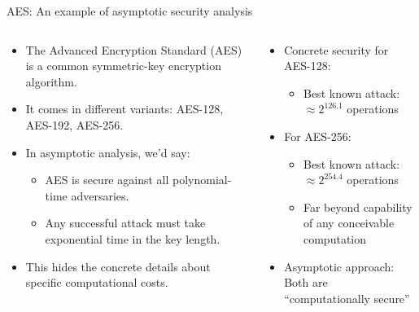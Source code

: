 \documentclass[aspectratio=169, lualatex, handout]{beamer}
\begin{document}
\begin{frame}{AES: An example of asymptotic security analysis}
	\begin{columns}[c]
		\begin{column}{0.5\textwidth}
			\begin{itemize}[<+->]
				\item The Advanced Encryption Standard (AES) is a common symmetric-key encryption algorithm.
				\item It comes in different variants: AES-128, AES-192, AES-256.
				\item In asymptotic analysis, we'd say:
				      \begin{itemize}
					      \item AES is secure against all polynomial-time adversaries.
					      \item Any successful attack must take exponential time in the key length.
				      \end{itemize}
				\item This hides the concrete details about specific computational costs.
			\end{itemize}
		\end{column}
		\begin{column}{0.5\textwidth}
			\begin{itemize}[<+->]
				\item Concrete security for AES-128:
				      \begin{itemize}
					      \item Best known attack: $\approx 2^{126.1}$ operations
				      \end{itemize}
				\item For AES-256:
				      \begin{itemize}
					      \item Best known attack: $\approx 2^{254.4}$ operations
					      \item Far beyond capability of any conceivable computation
				      \end{itemize}
				\item Asymptotic approach: Both are ``computationally secure''
			\end{itemize}
		\end{column}
	\end{columns}
\end{frame}
\end{document}
